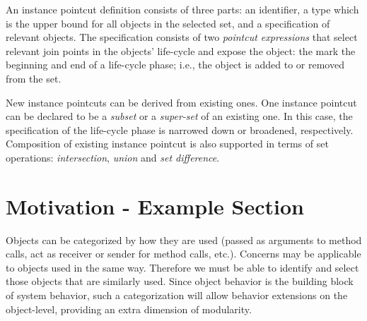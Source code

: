 \documentclass{llncs}
\begin{document}
An instance pointcut definition consists of three parts: an identifier, a type which is the upper bound for all objects in the selected set, and a specification of relevant objects.
The specification consists of two \emph{pointcut expressions} that select relevant join points in the objects' life-cycle and expose the object: the mark the beginning and end of a life-cycle phase; i.e., the object is added to or removed from the set.

New instance pointcuts can be derived from existing ones. One instance pointcut can be declared to be a \emph{subset} or a \emph{super-set} of an existing one.
In this case, the specification of the life-cycle phase is narrowed down or broadened, respectively.
Composition of existing instance pointcut is also supported in terms of set operations: \emph{intersection}, \emph{union} and \emph{set difference}. 



\section{Motivation - Example Section}
\label{sect:motivation}

Objects can be categorized by how they are used (passed as arguments to method calls, act as receiver or sender for method calls, etc.). Concerns may be applicable to objects used in the same way. Therefore we must be able to identify and select those objects that are similarly used. Since object behavior is the building block of system behavior, such a categorization will allow behavior extensions on the object-level, providing an extra dimension of modularity.
\end{document}
